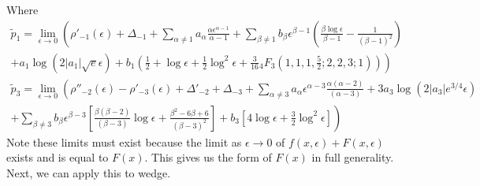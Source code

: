 \documentclass{article}
\begin{document}
Where
\begin{align}
    \tilde{p}_1 = \lim_{\epsilon \to 0} \left(\rho'_{-1}(\epsilon) + \Delta_{-1} + \sum_{\alpha \neq 1} a_{\alpha}\frac{\alpha\epsilon^{\alpha-1}}{\alpha-1} + \sum_{\beta \neq 1} b_{\beta}\epsilon^{\beta-1}\left(\frac{\beta \log \epsilon}{\beta-1}-\frac{1}{(\beta-1)^2}\right)\right.  \nonumber \\
     \left.+ a_1\log \left({2|a_1|\sqrt{e}\epsilon}\right) + b_1\left(\frac{1}{2} + \log \epsilon + \frac{1}{2}\log^2\epsilon + \frac{3}{16}{_4}F_3\left(1,1,1,\frac{5}{2};2,2,3;1\right)\right)\right)
\end{align}
\begin{align}
    \tilde{p}_3 = \lim_{\epsilon\to 0} \left(\rho''_{-2}(\epsilon) - \rho'_{-3}(\epsilon) + \Delta'_{-2}+\Delta_{-3} + \sum_{\alpha \neq 3} a_{\alpha}\epsilon^{\alpha-3}\frac{\alpha(\alpha-2)}{(\alpha-3)} +3a_3\log\left(2|a_3|e^{3/4}\epsilon\right) \right. \nonumber \\
    \left.+ \sum_{\beta \neq 3} b_{\beta}\epsilon^{\beta-3}\left[\frac{\beta(\beta-2)}{(\beta-3)}\log \epsilon + \frac{\beta^2-6\beta+6}{(\beta-3)^2}\right] +b_3\left[ 4\log\epsilon + \frac{3}{2}\log^2\epsilon \right] \right)
\end{align}
Note these limits must exist because the limit as $\epsilon\to 0$ of $f(x,\epsilon) + F(x,\epsilon)$ exists and is equal to $F(x)$. This gives us the form of $F(x)$ in full generality. Next, we can apply this to wedge.
\end{document}
